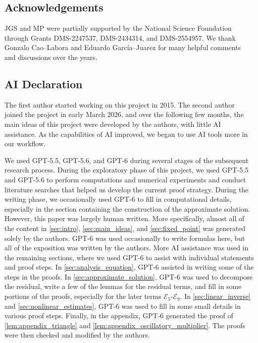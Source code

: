 \documentclass[11pt]{amsart}
\theoremstyle{definition}
\theoremstyle{remark}
\numberwithin{equation}{section}
\newcommand{\mc}[1]{\mathcal{#1}}
\begin{document}
\subsection*{Acknowledgements}

JGS and MP were partially supported by the National Science
Foundation through Grants DMS-2247537, DMS-2434314, and DMS-2554957. We thank Gonzalo Cao--Labora and Eduardo Garc\'ia--Juarez for many helpful comments and discussions over the years.

\subsection*{AI Declaration}

The first author started working on this project in 2015. The second author joined the project in early March 2026, and over the following few months, the main ideas of this project were developed by the authors, with little AI assistance. As the capabilities of AI improved, we began to use AI tools more in our workflow. \par
We used GPT-5.5, GPT-5.6, and GPT-6 during several stages of the subsequent research process. During the exploratory phase of this project, we used GPT-5.5 and GPT-5.6 to perform computations and numerical experiments and conduct literature searches that helped us develop the current proof strategy. During the writing phase, we occasionally used GPT-6 to fill in computational details, especially in the section containing the construction of the approximate solution. However, this paper was largely human written.  More specifically, almost all of the content in \cref{sec:intro}, \cref{sec:main_ideas}, and \cref{sec:fixed_point} was generated solely by the authors. GPT-6 was used occasionally to write formulas here, but all of the exposition was written by the authors. More AI assistance was used in the remaining sections, where we used GPT-6 to assist with individual statements and proof steps. In \cref{sec:analysis_equation}, GPT-6 assisted in writing some of the steps in the proofs. In \cref{sec:approximate_solution}, GPT-6 was used to decompose the residual, write a few of the lemmas for the residual terms, and fill in some portions of the proofs, especially for the later terms $\mc{E}_5$-$\mc{E}_9$. In \cref{sec:linear_inverse} and \cref{sec:nonlinear_estimates}, GPT-6 was used to fill in some small details in various proof steps. Finally, in the appendix, GPT-6 generated the proof of \cref{lem:appendix_triangle} and \cref{lem:appendix_oscillatory_multiplier}. The proofs were then checked and modified by the authors.   \par 
\end{document}
